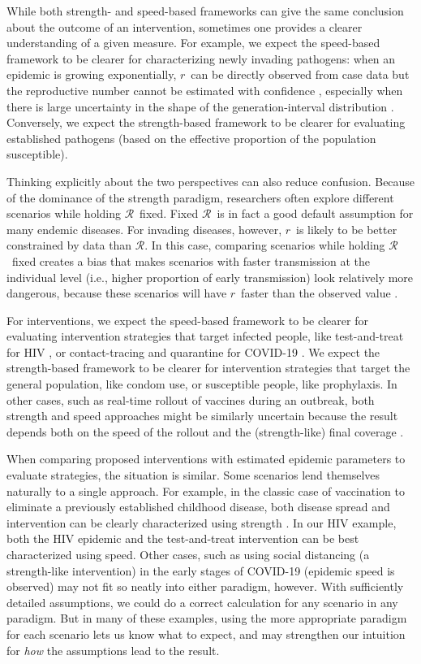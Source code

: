 \documentclass[12pt]{article}
\newcommand{\RR}{\ensuremath{{\mathcal R}}}
\newcommand{\rr}{\ensuremath{{r}}}
\begin{document}
While both strength- and speed-based frameworks can give the same conclusion about the outcome of an intervention, sometimes one provides a clearer understanding of a given measure.
For example, we expect the speed-based framework to be clearer for characterizing newly invading pathogens: when an epidemic is growing exponentially, \rr\ can be directly observed from case data but the reproductive number cannot be estimated with confidence \citep{weitz2015modeling}, especially when there is large uncertainty in the shape of the generation-interval distribution \citep{park2020reconciling}.
Conversely, we expect the strength-based framework to be clearer for evaluating established pathogens (based on the effective proportion of the population susceptible).

Thinking explicitly about the two perspectives can also reduce confusion. Because of the dominance of the strength paradigm, researchers often explore different scenarios while holding \RR\ fixed. Fixed \RR\ is in fact a good default assumption for many endemic diseases. For invading diseases, however, \rr\ is likely to be better constrained by data than \RR. In this case, comparing scenarios while holding \RR\ fixed creates a bias that makes scenarios with faster transmission at the individual level (i.e., higher proportion of early transmission) look relatively more dangerous, because these scenarios will have \rr\ faster than the observed value \citep{eaton2014proportion, powers2014impact, park2019practical}.

For interventions, we expect the speed-based framework to be clearer for evaluating intervention strategies that target infected people, like test-and-treat for HIV \citep{granich2009universal}, or contact-tracing and quarantine for COVID-19 \citep{hellewell2020feasibility}. 
We expect the strength-based framework to be clearer for intervention strategies that target the general population, like condom use, or susceptible people, like prophylaxis.
In other cases, such as real-time rollout of vaccines during an outbreak, both strength and speed approaches might be similarly uncertain because the result depends both on the speed of the rollout and the (strength-like) final coverage \citep{shah2018mumps}.

When comparing proposed interventions with estimated epidemic parameters to evaluate strategies, the situation is similar. Some scenarios lend themselves naturally to a single approach. For example, in the classic case of vaccination to eliminate a previously established childhood disease, both disease spread and intervention can be clearly characterized using strength \citep{anderson1985vaccination}. In our HIV example, both the HIV epidemic and the test-and-treat intervention can be best characterized using speed. Other cases, such as using social distancing (a strength-like intervention) in the early stages of COVID-19 (epidemic speed is observed) may not fit so neatly into either paradigm, however.
With sufficiently detailed assumptions, we could do a correct calculation for any scenario in any paradigm. 
But in many of these examples, using the more appropriate paradigm for each scenario lets us know what to expect, and may strengthen our intuition for \emph{how} the assumptions lead to the result.
\end{document}
